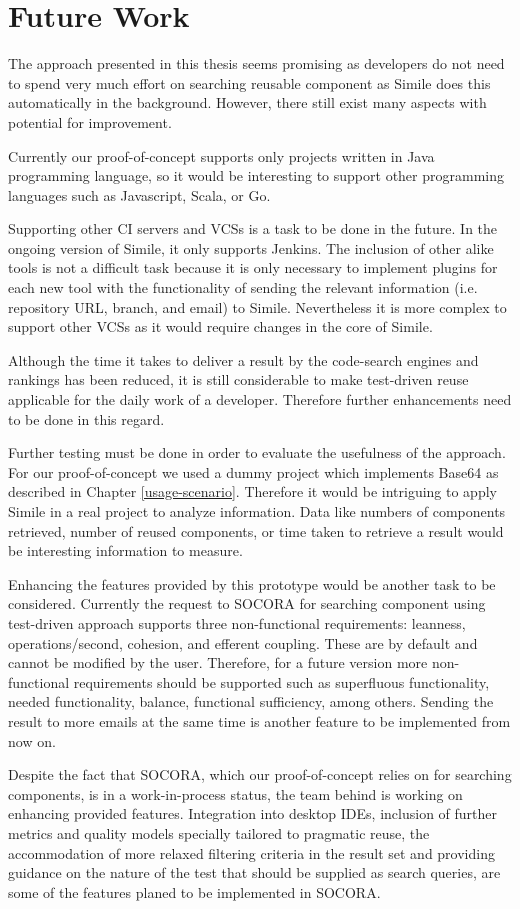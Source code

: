 \chapter{Future Work}
\label{future-work}
The approach presented in this thesis seems promising as developers do not need to spend very much effort on searching reusable component as Simile does this automatically in the background. However, there still exist many aspects with potential for improvement.

Currently our proof-of-concept supports only projects written in Java programming language, so it would be interesting to support other programming languages such as Javascript, Scala, or Go. 

Supporting other CI servers and VCSs is a task to be done in the future. In the ongoing version of Simile, it only supports Jenkins. The inclusion of other alike tools is not a difficult task because it is only necessary to implement plugins for each new tool with the functionality of sending the relevant information (i.e. repository URL, branch, and email) to Simile. Nevertheless it is more complex to support other VCSs as it would require changes in the core of Simile.

Although the time it takes to deliver a result by the code-search engines and rankings has been reduced, it is still considerable to make test-driven reuse applicable for the daily work of a developer. Therefore further enhancements need to be done in this regard.

Further testing must be done in order to evaluate the usefulness of the approach. For our proof-of-concept we used a dummy project which implements Base64 as described in Chapter \ref{usage-scenario}. Therefore it would be intriguing to apply Simile in a real project to analyze information. Data like numbers of components retrieved, number of reused components, or time taken to retrieve a result would be interesting information to measure.

Enhancing the features provided by this prototype would be another task to be considered. Currently the request to SOCORA for searching component using test-driven approach supports three non-functional requirements: leanness, operations/second, cohesion, and efferent coupling. These are by default and cannot be modified by the user. Therefore, for a future version more non-functional requirements should be supported such as superfluous functionality, needed functionality, balance, functional sufficiency, among others. Sending the result to more emails at the same time is another feature to be implemented from now on.

Despite the fact that SOCORA, which our proof-of-concept relies on for searching components, is in a work-in-process status, the team behind is working on enhancing provided features. Integration into desktop IDEs, inclusion of further metrics and quality models specially tailored to pragmatic reuse, the accommodation of more relaxed filtering criteria in the result set and providing guidance on the nature of the test that should be supplied as search queries, are some of the features planed to be implemented in SOCORA\cite{Kessel2016}.